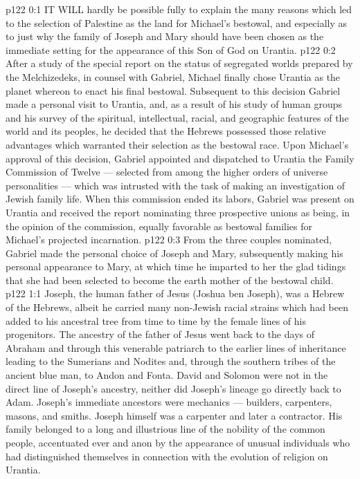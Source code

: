 \vs p122 0:1 IT WILL hardly be possible fully to explain the many reasons which led to the selection of Palestine as the land for Michael’s bestowal, and especially as to just why the family of Joseph and Mary should have been chosen as the immediate setting for the appearance of this Son of God on Urantia.
\vs p122 0:2 After a study of the special report on the status of segregated worlds prepared by the Melchizedeks, in counsel with Gabriel, Michael finally chose Urantia as the planet whereon to enact his final bestowal. Subsequent to this decision Gabriel made a personal visit to Urantia, and, as a result of his study of human groups and his survey of the spiritual, intellectual, racial, and geographic features of the world and its peoples, he decided that the Hebrews possessed those relative advantages which warranted their selection as the bestowal race. Upon Michael’s approval of this decision, Gabriel appointed and dispatched to Urantia the Family Commission of Twelve --- selected from among the higher orders of universe personalities --- which was intrusted with the task of making an investigation of Jewish family life. When this commission ended its labors, Gabriel was present on Urantia and received the report nominating three prospective unions as being, in the opinion of the commission, equally favorable as bestowal families for Michael’s projected incarnation.
\vs p122 0:3 From the three couples nominated, Gabriel made the personal choice of Joseph and Mary, subsequently making his personal appearance to Mary, at which time he imparted to her the glad tidings that she had been selected to become the earth mother of the bestowal child.
\vs p122 1:1 Joseph, the human father of Jesus (Joshua ben Joseph), was a Hebrew of the Hebrews, albeit he carried many non\hyp{}Jewish racial strains which had been added to his ancestral tree from time to time by the female lines of his progenitors. The ancestry of the father of Jesus went back to the days of Abraham and through this venerable patriarch to the earlier lines of inheritance leading to the Sumerians and Nodites and, through the southern tribes of the ancient blue man, to Andon and Fonta. David and Solomon were not in the direct line of Joseph’s ancestry, neither did Joseph’s lineage go directly back to Adam. Joseph’s immediate ancestors were mechanics --- builders, carpenters, masons, and smiths. Joseph himself was a carpenter and later a contractor. His family belonged to a long and illustrious line of the nobility of the common people, accentuated ever and anon by the appearance of unusual individuals who had distinguished themselves in connection with the evolution of religion on Urantia.
